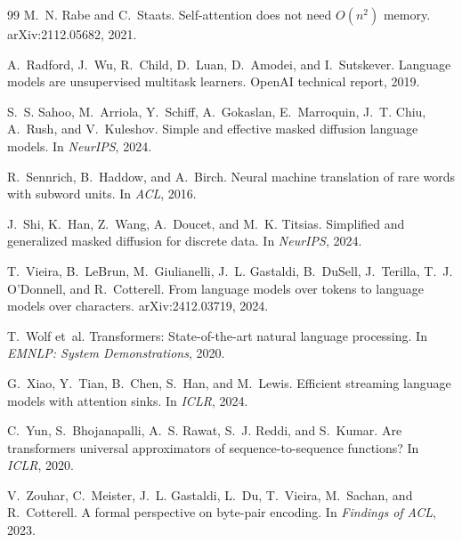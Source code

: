 \documentclass[10pt]{article}
\theoremstyle{qpt}
\begin{document}
\begin{thebibliography}{99}
M.~N. Rabe and C.~Staats.
\newblock Self-attention does not need {$O(n^2)$} memory.
\newblock arXiv:2112.05682, 2021.

A.~Radford, J.~Wu, R.~Child, D.~Luan, D.~Amodei, and I.~Sutskever.
\newblock Language models are unsupervised multitask learners.
\newblock OpenAI technical report, 2019.

S.~S. Sahoo, M.~Arriola, Y.~Schiff, A.~Gokaslan, E.~Marroquin, J.~T. Chiu, A.~Rush, and V.~Kuleshov.
\newblock Simple and effective masked diffusion language models.
\newblock In \emph{NeurIPS}, 2024.

R.~Sennrich, B.~Haddow, and A.~Birch.
\newblock Neural machine translation of rare words with subword units.
\newblock In \emph{ACL}, 2016.

J.~Shi, K.~Han, Z.~Wang, A.~Doucet, and M.~K. Titsias.
\newblock Simplified and generalized masked diffusion for discrete data.
\newblock In \emph{NeurIPS}, 2024.

T.~Vieira, B.~LeBrun, M.~Giulianelli, J.~L. Gastaldi, B.~DuSell, J.~Terilla, T.~J. O'Donnell, and R.~Cotterell.
\newblock From language models over tokens to language models over characters.
\newblock arXiv:2412.03719, 2024.

T.~Wolf et~al.
\newblock Transformers: State-of-the-art natural language processing.
\newblock In \emph{EMNLP: System Demonstrations}, 2020.

G.~Xiao, Y.~Tian, B.~Chen, S.~Han, and M.~Lewis.
\newblock Efficient streaming language models with attention sinks.
\newblock In \emph{ICLR}, 2024.

C.~Yun, S.~Bhojanapalli, A.~S. Rawat, S.~J. Reddi, and S.~Kumar.
\newblock Are transformers universal approximators of sequence-to-sequence functions?
\newblock In \emph{ICLR}, 2020.

V.~Zouhar, C.~Meister, J.~L. Gastaldi, L.~Du, T.~Vieira, M.~Sachan, and R.~Cotterell.
\newblock A formal perspective on byte-pair encoding.
\newblock In \emph{Findings of ACL}, 2023.

\end{thebibliography}
\end{document}
